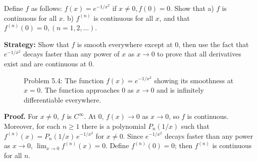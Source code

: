 \begin{problembox}
Define \( f \) as follows: \( f(x) = e^{-1/x^2} \) if \( x \neq 0, f(0) = 0 \). Show that
a) \( f \) is continuous for all \( x \).
b) \( f^{(n)} \) is continuous for all \( x \), and that \( f^{(n)}(0) = 0, (n = 1, 2, \ldots ) \).
\end{problembox}

\noindent\textbf{Strategy:} Show that \( f \) is smooth everywhere except at 0, then use the fact that \( e^{-1/x^2} \) decays faster than any power of \( x \) as \( x \to 0 \) to prove that all derivatives exist and are continuous at 0.

\begin{figure}[h]
\centering
{}
\caption{Problem 5.4: The function $f(x) = e^{-1/x^2}$ showing its smoothness at $x=0$. The function approaches 0 as $x \to 0$ and is infinitely differentiable everywhere.}
\end{figure}

\noindent\textbf{Proof.}
For $x\ne 0$, $f$ is $C^{\infty}$. At $0$, $f(x)\to 0$ as $x\to 0$, so $f$ is continuous. Moreover, for each $n\ge 1$ there is a polynomial $P_n(1/x)$ such that $f^{(n)}(x)=P_n(1/x)\,e^{-1/x^2}$ for $x\ne 0$. Since $e^{-1/x^2}$ decays faster than any power as $x\to 0$, $\lim_{x\to 0}f^{(n)}(x)=0$. Define $f^{(n)}(0)=0$; then $f^{(n)}$ is continuous for all $n$.



